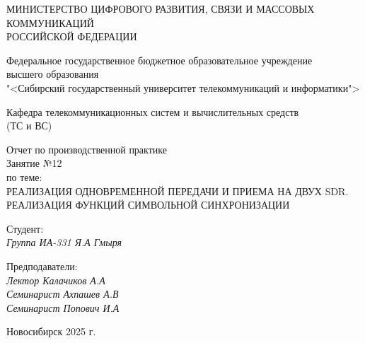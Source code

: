 \thispagestyle{empty}

\begin{center}
    МИНИСТЕРСТВО ЦИФРОВОГО РАЗВИТИЯ, СВЯЗИ И МАССОВЫХ КОММУНИКАЦИЙ \\ РОССИЙСКОЙ ФЕДЕРАЦИИ

    \vspace{20pt}

    Федеральное государственное бюджетное образовательное учреждение  \\  высшего образования \\
    "<Сибирский государственный университет телекоммуникаций и информатики"> \\

    \vspace{20pt}

    Кафедра телекоммуникационных систем и вычислительных средств \\  (ТС и ВС)
\end{center}

\vfill

\begin{center}
    Отчет по производственной практике \\  
    Занятие №12 \\

    \vspace{20pt}
    по теме: \\
    \uppercase{Реализация одновременной передачи и приема на двух SDR. Реализация функций символьной синхронизации}
\end{center}

\vfill

    \noindent Студент: \\
    \textit{Группа ИА-331 \hfill Я.А Гмыря}

    \vspace{20pt}

    \noindent Предподаватели: \\
    \textit{Лектор \hfill Калачиков А.А} \\
    \textit{Семинарист \hfill Ахпашев А.В} \\
    \textit{Семинарист \hfill Попович И.А}

\vfill

\begin{center}
    Новосибирск 2025 г.
\end{center}